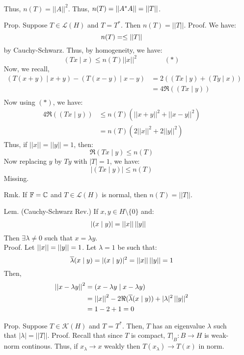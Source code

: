 \documentclass[12pt]{article}
\begin{document}
\begin{itemize}
\begin{align*}
    \end{align*}
    Thus, $n(T) = ||A||^2$. Thus, $n(T) = \left\vert\left\vert A^*A\right\vert\right\vert = \left\vert\left\vert T\right\vert\right\vert$.
    \item[Prop.] Suppose $T \in \mathcal{L}(H)$ and $T = T^*$. Then $n(T) = ||T||$. \bbni
    Proof. We have: 
    \[ n(T) = \leq \left\vert\left\vert T\right\vert\right\vert\]
    by Cauchy-Schwarz. Thus, by homogeneity, we have:
    \[ (Tx \mid x) \leq n(T)||x||^2 \qquad \qquad (*)\]
    Now, we recall, 
    \begin{align*}
        (T(x+y) \mid x+y) - (T(x-y) \mid x-y) &= 2((Tx \mid y) + (Ty \mid x)) \\
        &= 4\Re((Tx \mid y)) \\
    \end{align*}
    Now using $(*)$, we have:
    \begin{align*}
        4\Re((Tx \mid y)) &\leq n(T)(||x+y||^2 + ||x-y||^2) \\
        &= n(T)(2||x||^2 + 2||y||^2)
    \end{align*}
    Thus, if $||x|| = ||y|| = 1$, then:
    \[ \Re(Tx \mid y) \leq n(T)\]
    Now replacing $y$ by $Ty$ with $|T| = 1$, we have:
    \[ |(Tx \mid y)| \leq n(T) \]
    Missing. 
    \item[Rmk.] If $\mathbb F = \mathbb C$ and $T \in \mathcal{L}(H)$ is normal, then $n(T) = ||T||$. 
    \item[Lem.] (Cauchy-Schwarz Rev.) If $x, y \in H \setminus \{0\}$ and: 
    \begin{align*}
        |(x \mid y)| &= \left\vert\left\vert x\right\vert\right\vert\left\vert\left\vert y\right\vert\right\vert 
    \end{align*} 
    Then $\exists \lambda \neq 0$ such that $x = \lambda y$. \\
    Proof. Let $\left\vert\left\vert x\right\vert\right\vert = \left\vert\left\vert y\right\vert\right\vert = 1$. Let $\lambda = 1$ be such that:
    \[ \overline{\lambda}(x \mid y) = |(x \mid y)|^2 = \left\vert\left\vert x\right\vert\right\vert\left\vert\left\vert y\right\vert\right\vert = 1\]
    Then, 
    \begin{align*}
        \left\vert\left\vert x-\lambda y\right\vert\right\vert^2 &= (x - \lambda y \mid x - \lambda y) \\
        &= \left\vert\left\vert x\right\vert\right\vert^2 -2 \Re(\overline{\lambda}(x \mid y)) + |\lambda|^2 \left\vert\left\vert y\right\vert\right\vert^2 \\
        &= 1 - 2  + 1 = 0
    \end{align*}
    \item[Prop.] Suppose $T \in \mathcal{K}(H)$ and $T = T^*$. Then, $T$ has an eigenvalue $\lambda$ such that $|\lambda| = ||T||$. \bbni
    Proof. Recall that since $T$ is compact, $T|_B: B \to H$ is weak-norm continous. Thus, if $x_\lambda \to x$ weakly then $T(x_\lambda) \to T(x)$ in norm.  \\

\end{itemize}
\end{document}

